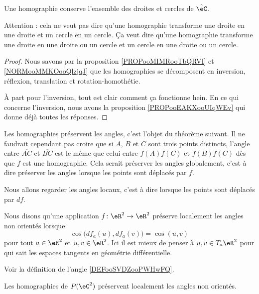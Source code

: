 \begin{proposition}     \label{PROPooYFJBooAWxFIs}
    Une homographie conserve l'ensemble des droites et cercles de $\hat\eC$.
\end{proposition}
Attention : cela ne veut pas dire qu'une homographie transforme une droite en une droite et un cercle en un cercle. Ça veut dire qu'une homographie transforme une droite en une droite ou un cercle et un cercle en une droite ou un cercle.

\begin{proof}
    Nous savons par la proposition \ref{PROPooMIMRooTbQRVI} et \ref{NORMooMMKOooQlzjqJ} que les homographies se décomposent en inversion, réflexion, translation et rotation-homothétie.

    À part pour l'inversion, tout est clair comment ça fonctionne hein. En ce qui concerne l'inversion, nous avons la proposition \ref{PROPooEAKXooUIqWEv} qui donne déjà toutes les réponses.

\end{proof}

\begin{normaltext}
    Les homographies préservent les angles, c'est l'objet du théorème suivant. Il ne faudrait cependant pas croire que si \( A\), \( B\) et \( C\) sont trois points distincts, l'angle entre \( \overline{ AC }\) et \( \overline{ BC }\) est le même que celui entre \( \overline{ f(A)f(C) }\) et \( \overline{ f(B)f(C) }\) dès que \( f\) est une homographie. Cela serait préserver les angles globalement, c'est à dire préserver les angles lorsque les points sont déplacés par \( f\).

    Nous allons regarder les angles locaux, c'est à dire lorsque les points sont déplacés par \( df\).
\end{normaltext}

\begin{definition}
    Nous disons qu'une application \( f\colon \eR^2\to \eR^2\) préserve localement les angles non orientés lorsque
    \begin{equation}
        \cos\big( df_a(u),df_a(v) \big)=\cos(u,v)
    \end{equation}
    pour tout \( a\in \eR^2\) et \( u,v\in \eR^2\). Ici il est mieux de penser à \( u,v\in T_a\eR^2\) pour qui sait les espaces tangents en géométrie différentielle.
\end{definition}
Voir la définition de l'angle \ref{DEFooSVDZooPWHwFQ}.

\begin{theorem}
    Les homographies de \( P(\eC^2)\) préservent localement les angles non orientés.
\end{theorem}

